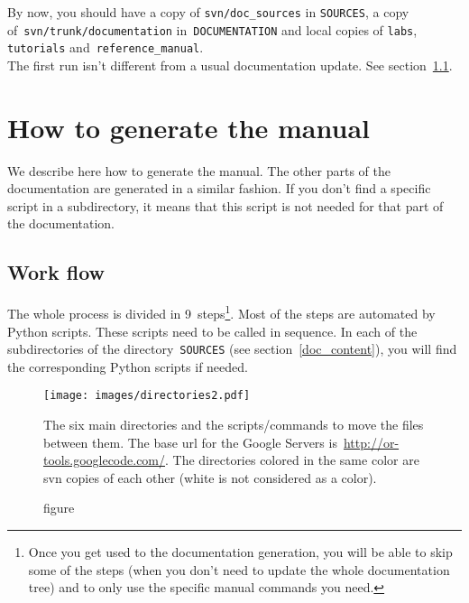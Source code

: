 \documentclass[a4paper,10pt]{article}
\newcommand{\code}[1]{\texttt{#1}}
\begin{document}
By now, you should have a copy of \code{svn/doc\_sources} in \code{SOURCES}, a copy of~\code{svn/trunk/documentation} in~\code{DOCUMENTATION} and local copies of \code{labs}, \code{tutorials} and~\code{reference\_manual}.\\

The first run isn't different from a usual documentation update. See section~\ref{work_flow}.

\section{How to generate the manual}

We describe here how to generate the manual. The other parts of the documentation are generated in a similar fashion.
If you don't find a specific script in a subdirectory, it means that this script is not needed for that part of the  documentation.

\subsection{Work flow}
\label{work_flow}

The whole process is divided in 9~steps\footnote{Once you get used to the documentation generation, you will be able to skip some of the steps (when you don't need to update the whole documentation tree) and to only use the specific manual commands you need.}. Most of the steps are automated by Python scripts. These scripts need to be called in sequence. In each of the subdirectories of the directory~\code{SOURCES} (see section~\ref{doc_content}), you will find the corresponding Python scripts if needed.\\


\begin{figure}[h]
   \centering
   \texttt{[image: images/directories2.pdf]}
   \caption{figure}{The six main directories and the scripts/commands to move the files between them. The base url for the Google Servers is~\href{http://or-tools.googlecode.com/}{http://or-tools.googlecode.com/}. The directories colored in the same color are svn copies of each other (white is not considered as a color).}\label{pic_directories}
 \end{figure}
\end{document}
